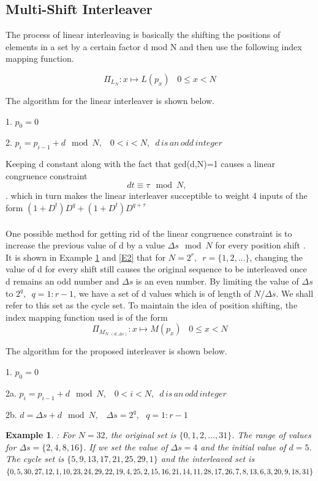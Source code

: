 \documentclass[twocolumn]{article}
\newtheorem{example}[theorem]{Example}
\begin{document}
 \subsection{Multi-Shift Interleaver}
 The process of linear interleaving is basically the shifting the positions of elements in
 a set by a certain factor d mod N and then use the following index mapping function.
 
 $$\Pi_{\mathit{L}_{N}} : x \mapsto L(p_x)\,\,\,\,\, 0\leq x<N$$
 
 The algorithm for the linear interleaver is shown below.
  
   1. $p_0=0$
 
  2. $p_i=p_{i-1}+d \mod N,\,\,\,\,\, 0<i<N,\,\,\, \mathit{d \,is \,an \,odd \,integer}$
 
 
 Keeping d constant along with the fact that gcd(d,N)=1 causes a linear congruence
  constraint 
 $$ dt \equiv \tau \mod N, \,\,\,\, $$. which in turn makes the
  linear interleaver succeptible to weight 4 inputs of the form 
  $(1+D^t)D^q+(1+D^t)D^{q+\tau}$
  \paragraph{}
  One possible method for getting rid of the linear congruence constraint is to increase
  the previous value of d by a value $\Delta s \mod N$  for every position shift . 
  It is shown in Example \ref{E1} and \ref{E2}
   that for $N=2^r,\,\,\, r=\{1,2,...\}$, changing the value of d for every shift still 
   causes
   the original sequence to be interleaved once d remains an odd number and $\Delta s$
   is an even number. By limiting the value of $\Delta s$ to $2^q,\,\,\, q=1:r-1$, we 
   have a set of d values which is of length of $N/\Delta s$. We shall refer to this 
   set as the cycle set. To maintain the idea of position shifting, the index mapping
   function used is of the form 
   $$\Pi_{\mathit{M}_{N:(d,\Delta s)}} : x \mapsto M(p_x)\,\,\,\,\, 0\leq x<N$$
  
  The algorithm for the proposed interleaver is shown below.
  
   1. $p_0=0$
 
 2a. $p_i=p_{i-1}+d \mod N,\,\,\,\,\, 0<i<N,\,\,\, \mathit{d \,is \,an \,odd \,integer}$
 
 2b. $d=\Delta s +d \mod N, \,\,\,\,\, \Delta s =2^q, \,\,\,\, q=1:r-1$
 
 
 \begin{example}
 \label{E1}
 : For $N=32$, the original set is $\{0,1,2,...,31\}$. The range of values for 
 $\Delta s = \{ 2,4,8,16\}$.  If we set the value
 of $\Delta s = 4$ and the initial value of $d=5$. 
 The cycle set is $\{ 5,9,13,17,21,25,29,1\}$ and the interleaved set is 
$\{0,5,30,27,12,1,10,23,24,29,22,19, 4, 25 ,2,15 ,16,21,\\14,11, 28,17,
  26, 7, 8, 13, 6, 3, 20, 9, 18, 31\}$
 \end{example}
 
\end{document}
